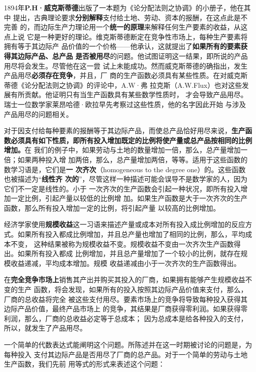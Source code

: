 1894年\textbf{P.H·威克斯蒂德}出版了一本题为《论分配法则之协调》的小册子，他在其中
提出，古典理论要求\textbf{分别解释}支付给土地、劳动、资本的报酬，在这点此是不完善
的，而边际生产力理论用一个\textbf{统一的原理}来解释任何生产要素的收益，从这点上说
它是一种更好的理论。维克斯蒂德断定在竞争性市场上，每种生产要素将拥有等于其边际产
品价值的一个价格——他承认，这就提出了\textbf{如果所有的要素获得其边际产品、总产品
  是否被用尽}的问题。他试图证明这一结果，即所说的产品用尽将会发生。尽管他在这一尝
试上未能成功。然而威克斯蒂德的确指出，发生产品用尽\textbf{必须存在竞争}，并且，厂
商的生产函数必须具有某些性质。在对威克斯蒂德《论分配法则之协调》的评论中，A.W·弗
拉克斯（A.W.Flux）也对这些发展有所贡献。他证明只有当生产函数具有某些数学性质时，
才会导致产品用尽。瑞士一位数学家莱昂哈德·欧拉早先考察过这些性质，他的名字因此开始
与涉及产品用尽的问题相关。

对于因支付给每种要素的报酬等于其边际产品，而使总产品恰好用尽来说，\textbf{生产函
  数必须具有如下性质，即所有投入增加既定的比例将使产量或总产品按相同的比例增加。}在
我们的例子中，如果劳动与土地的数量增加一倍，那么，总产量增加一倍；如果两种投入增
加两倍，那么，总产量增加两倍，等等。适用于这些函数的数学习语是，它们是\textbf{一
  次齐次}（homogeneous to the degree one）的。这些函数也被描述为“\textbf{线性齐
  次的}”，尽管这样一种描述可能会误导不是数学家的人，因为它们不一定是线性的。小于
一次齐次的生产函数会引起一种状况，即所有投入增加一定比例，引起产量以较低的比例增
加。如果生产函数是大于一次齐次的生产函数，那么所有投入增加一定的比例，将引起产量
以较高的比例增加。

经济学家使用\textbf{规模收益}这一习语来描述产量或成本对所有投入成比例增加的反应方
式。如果所有投入都成比例增加，并且总产量也增加了相同的比例，那么，平均成本不变，
这种结果被称为规模收益不变。规模收益不变由一次齐次生产函数得出。如果所有投入都成
比例增加，并且总产量增加了一个较小的比例，就存在规模收益递减，平均成本增加。规模
收益递减由小于一次齐次的生产函数得出。

在\textbf{完全竞争市场上}销售其产出并购买其投入的厂商，如果拥有能够产生规模收益不变的生产
函数，将会发现，如果所有的投入按照其边际产品价值来支付，那么，厂商的总收益将完全
被这些支付用尽。要素市场上的竞争将导致每种投入获得其边际产品价值，最终产品市场上
的竞争，其结果是厂商获得零利润。如果获得零利润，那么，厂商的总收益必定等于总成本；
因为总成本是给各种投入的支付，所以，就发生了产品用尽。

一个简单的代数表达式能阐明这个问题。所陈述并在这一时期被讨论的问题是，为每种投入
支付其边际产品是否用尽了厂商的总产品。对于一个简单的劳动与土地生产函数，我们先前
用等式的形式来表述这个问题：

